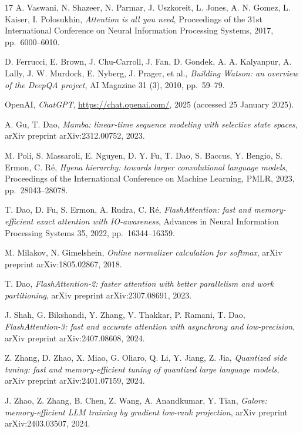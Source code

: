 \begin{chapterbibliography}{17}
  A. Vaswani, N. Shazeer, N. Parmar, J. Uszkoreit, L. Jones, A. N. Gomez,
  L. Kaiser, I. Polosukhin, \emph{Attention is all you need}, Proceedings of the
  31st International Conference on Neural Information Processing Systems, 2017,
  pp.~6000--6010.

  D. Ferrucci, E. Brown, J. Chu-Carroll, J. Fan, D. Gondek, A. A. Kalyanpur,
  A. Lally, J. W. Murdock, E. Nyberg, J. Prager, et al., \emph{Building Watson:
  an overview of the DeepQA project}, AI Magazine 31 (3), 2010, pp.~59--79.

  OpenAI, \emph{ChatGPT}, \url{https://chat.openai.com/}, 2025
  (accessed 25 January 2025).

  A. Gu, T. Dao, \emph{Mamba: linear-time sequence modeling with selective state spaces},
  arXiv preprint arXiv:2312.00752, 2023.

  M. Poli, S. Massaroli, E. Nguyen, D. Y. Fu, T. Dao, S. Baccus, Y. Bengio,
  S. Ermon, C. Ré, \emph{Hyena hierarchy: towards larger convolutional language models},
  Proceedings of the International Conference on Machine Learning, PMLR, 2023,
  pp.~28043--28078.

  T. Dao, D. Fu, S. Ermon, A. Rudra, C. Ré, \emph{FlashAttention: fast and memory-efficient
  exact attention with IO-awareness}, Advances in Neural Information Processing Systems
  35, 2022, pp.~16344--16359.

  M. Milakov, N. Gimelshein, \emph{Online normalizer calculation for softmax},
  arXiv preprint arXiv:1805.02867, 2018.

  T. Dao, \emph{FlashAttention-2: faster attention with better parallelism and work
  partitioning}, arXiv preprint arXiv:2307.08691, 2023.

  J. Shah, G. Bikshandi, Y. Zhang, V. Thakkar, P. Ramani, T. Dao,
  \emph{FlashAttention-3: fast and accurate attention with asynchrony and low-precision},
  arXiv preprint arXiv:2407.08608, 2024.

  Z. Zhang, D. Zhao, X. Miao, G. Oliaro, Q. Li, Y. Jiang, Z. Jia,
  \emph{Quantized side tuning: fast and memory-efficient tuning of quantized large language
  models}, arXiv preprint arXiv:2401.07159, 2024.

  J. Zhao, Z. Zhang, B. Chen, Z. Wang, A. Anandkumar, Y. Tian,
  \emph{Galore: memory-efficient LLM training by gradient low-rank projection},
  arXiv preprint arXiv:2403.03507, 2024.


\end{chapterbibliography}
